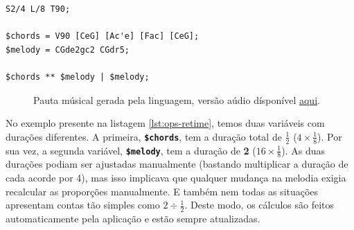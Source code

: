 \begin{lstlisting}[caption={Redimensionamento da duração de uma expressão músical},label=lst:ops-retime,belowcaptionskip=-\medskipamount]
S2/4 L/8 T90;

$chords = V90 [CeG] [Ac'e] [Fac] [CeG];
$melody = CGde2gc2 CGdr5;

$chords ** $melody | $melody;
\end{lstlisting}

\begin{figure}[ht]
  \centering
  {%
  \setlength{\fboxsep}{0pt}%
  \setlength{\fboxrule}{0pt}%
  }%
  \caption{Pauta músical gerada pela linguagem, versão aúdio dísponível \href{https://drive.google.com/file/d/1aVVXGDVQEAmHl-jadSnZ6OqIGmgqhgxR}{\underline{aqui}}\protect\footnotemark.}
  \label{fig:ops-retime}
\end{figure}

No exemplo presente na listagem \ref{lst:ops-retime}, temos duas variáveis com durações diferentes. A primeira, \textbf{\texttt{\$chords}}, tem a duração total de \textbf{$\frac{1}{2}$} ($4 \times \frac{1}{8}$). Por sua vez, a segunda variável, \textbf{\texttt{\$melody}}, tem a duração de \textbf{2} ($16 \times \frac{1}{8}$). As duas durações podiam ser ajustadas manualmente (bastando multiplicar a duração de cada acorde por 4), mas isso implicava que qualquer mudança na melodia exigia recalcular as proporções manualmente. E também nem todas as situações apresentam contas tão simples como $2 \div \frac{1}{2}$. Deste modo, os cálculos são feitos automaticamente pela aplicação e estão sempre atualizadas.

